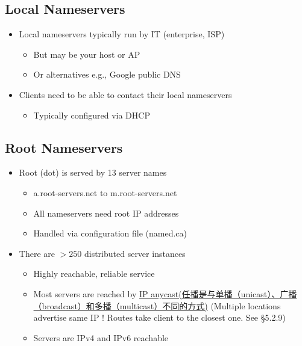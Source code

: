 \documentclass[12pt]{ctexart}   %
\begin{document}
	\subsection{Local Nameservers}
	\begin{itemize}
		\item Local nameservers typically run by IT (enterprise, ISP)
		\begin{itemize}
			\item But may be your host or AP
			\item Or alternatives e.g., Google public DNS
		\end{itemize}
		
		\item Clients need to be able to contact their local nameservers
		\begin{itemize}
			\item Typically configured via DHCP
		\end{itemize}
	\end{itemize}
	
	\subsection{Root Nameservers}
	\begin{itemize}
		\item Root (dot) is served by 13 server names
		\begin{itemize}
			\item a.root-servers.net to m.root-servers.net
			\item All nameservers need root IP addresses
			\item Handled via configuration file (named.ca)
		\end{itemize}
		
		\item There are $>250$ distributed server instances
		\begin{itemize}
			\item Highly reachable, reliable service
			\item Most servers are reached by \underline{IP anycast(任播是与单播（unicast）、广播（broadcast）和多播（multicast）不同的方式)} (Multiple locations advertise same IP ! Routes take client to the closest one. See §5.2.9)
			\item Servers are IPv4 and IPv6 reachable
		\end{itemize}
	\end{itemize}
	
\end{document}

